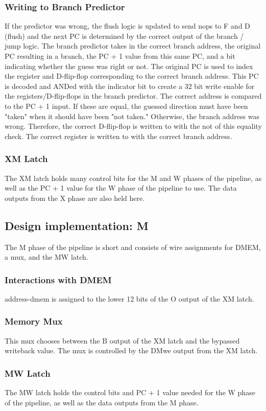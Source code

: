 \documentclass[letterpaper]{article} %
\begin{document}
\subsubsection{Writing to Branch Predictor}
If the predictor was wrong, the flush logic is updated to send nops to F and D (flush) and the next PC is determined by the correct output of the branch / jump logic. The branch predictor takes in the correct branch address, the original PC resulting in a branch, the PC + 1 value from this same PC, and a bit indicating whether the guess was right or not. The original PC is used to index the register and D-flip-flop corresponding to the correct branch address. This PC is decoded and ANDed with the indicator bit to create a 32 bit write enable for the registers/D-flip-flops in the branch predictor. The correct address is compared to the PC + 1 input. If these are equal, the guessed direction must have been "taken" when it should have been "not taken." Otherwise, the branch address was wrong. Therefore, the correct D-flip-flop is written to with the not of this equality check. The correct register is written to with the correct branch address. 

\subsubsection{XM Latch}
The XM latch holds many control bits for the M and W phases of the pipeline, as well as the PC + 1 value for the W phase of the pipeline to use. The data outputs from the X phase are also held here.

\subsection{Design implementation: M}
The M phase of the pipeline is short and consists of wire assignments for DMEM, a mux, and the MW latch.
\subsubsection{Interactions with DMEM}
address-dmem is assigned to the lower 12 bits of the O output of the XM latch.
\subsubsection{Memory Mux}
This mux chooses between the B output of the XM latch and the bypassed writeback value. The mux is controlled by the DMwe output from the XM latch.
\subsubsection{MW Latch}
The MW latch holds the control bits and PC + 1 value needed for the W phase of the pipeline, as well as the data outputs from the M phase.
\end{document}
